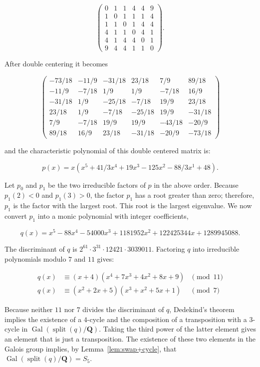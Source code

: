 \documentclass[oribibl,10pt]{llncs}
\newcommand{\rationals}{\mathbf{Q}}
\DeclareMathOperator{\Gal}{Gal}
\DeclareMathOperator{\splitting}{split}
\begin{document}
\begin{appendix}
\[
\begin{pmatrix}
0 & 1 & 1 & 4 & 4 & 9\\
1 & 0 & 1 & 1 & 1 & 4\\
1 & 1 & 0 & 1 & 4 & 4\\
4 & 1 & 1 & 0 & 4 & 1\\
4 & 1 & 4 & 4 & 0 & 1\\
9 & 4 & 4 & 1 & 1 & 0
\end{pmatrix}.
\]

After double centering it becomes

\[
\begin{pmatrix}
-73/18  &  -11/9  & -31/18  &  23/18  &    7/9  &  89/18\\
 -11/9  &  -7/18  &    1/9  &    1/9  &  -7/18  &   16/9\\
-31/18  &    1/9  & -25/18  &  -7/18  &   19/9  &  23/18\\
 23/18  &    1/9  &  -7/18  & -25/18  &   19/9  & -31/18\\
   7/9  &  -7/18  &   19/9  &   19/9  & -43/18  &  -20/9\\
 89/18  &   16/9  &  23/18  & -31/18  &  -20/9  & -73/18
\end{pmatrix}
\]

and the characteristic polynomial of this double centered matrix is:

\[ p(x) = x(x^5 + 41/3x^4 + 19x^3 - 125x^2 - 88/3x^1 + 48). \]

Let $p_0$ and $p_1$ be the two irreducible factors of $p$ in the above order.  Because $p_1(2) < 0$ and $p_1(3) > 0$, the factor $p_1$ has a root greater than zero; therefore, $p_1$ is the factor with the largest root. This root is the largest eigenvalue.  We now convert $p_1$ into a monic polynomial with integer coefficients,

\[q(x) = x^5 - 88x^4 - 54000x^3 + 1181952x^2 + 122425344x + 1289945088.\]

The discriminant of $q$ is $2^{61} \cdot 3^{31} \cdot 12421 \cdot 3039011$.  Factoring $q$ into irreducible polynomials modulo $7$ and $11$ gives:

\begin{align*}
q(x) &\equiv (x + 4)  (x^4 + 7x^3 + 4x^2 + 8x + 9) &\pmod{11}\\
q(x) &\equiv (x^2 + 2x + 5)  (x^3 + x^2 + 5x + 1) &\pmod{7}
\end{align*}

Because neither $11$ nor $7$ divides the discriminant of $q$, Dedekind's theorem implies the existence of a $4$-cycle and the composition of a transposition with a $3$-cycle in $\Gal(\splitting(q)/\rationals)$. Taking the third power of the latter element gives an element that is just a transposition. The existence of these two elements in the Galois group implies, by Lemma~\ref{lem:swap+cycle}, that $\Gal(\splitting(q)/\rationals) = S_5$.


\end{appendix}
\end{document}
